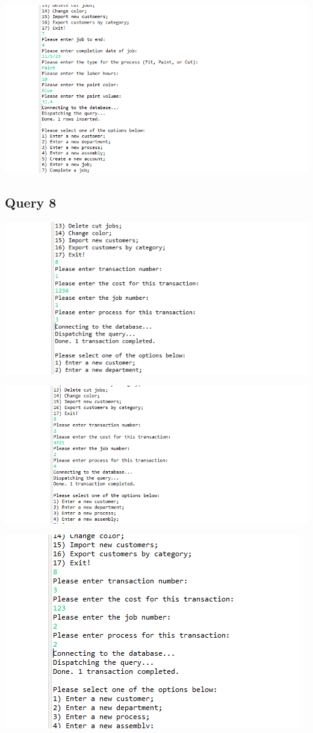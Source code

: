 \documentclass[11pt]{article}
\begin{document}
\includegraphics[width = \textwidth]{endJob5.png}
\subsection{Query 8}
\includegraphics[width = \textwidth]{tranCost1.png}

\includegraphics[width = \textwidth]{tranCost2.png}

\includegraphics[width = \textwidth]{tranCost3.png}
\end{document}
